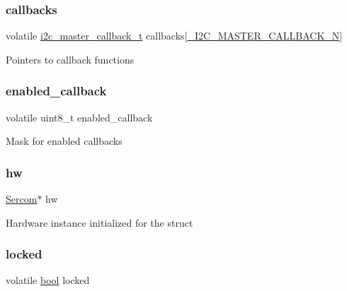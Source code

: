 \subsubsection{\texorpdfstring{callbacks}{callbacks}}
{\footnotesize\ttfamily volatile \mbox{\hyperlink{group__asfdoc__sam0__sercom__i2c__group_ga0ef653593dbacc01735c61e59ec3f0da}{i2c\+\_\+master\+\_\+callback\+\_\+t}} callbacks\mbox{[}\mbox{\hyperlink{group__asfdoc__sam0__sercom__i2c__group_gga844ac2694772642cfee08a29c50bf054a3563390afb1b1b26a6252e0b5981ed06}{\+\_\+\+I2\+C\+\_\+\+M\+A\+S\+T\+E\+R\+\_\+\+C\+A\+L\+L\+B\+A\+C\+K\+\_\+N}}\mbox{]}}

Pointers to callback functions \mbox{\label{structi2c__master__module_a88dcc0d45e96ac358f7e095040d108bc}} 
\subsubsection{\texorpdfstring{enabled\_callback}{enabled\_callback}}
{\footnotesize\ttfamily volatile uint8\+\_\+t enabled\+\_\+callback}

Mask for enabled callbacks \mbox{\label{structi2c__master__module_a0c1e47f7408dce5f667a53398c82d13a}} 
\subsubsection{\texorpdfstring{hw}{hw}}
{\footnotesize\ttfamily \mbox{\hyperlink{union_sercom}{Sercom}}$\ast$ hw}

Hardware instance initialized for the struct \mbox{\label{structi2c__master__module_a765892434f9329ded45a5287eeb75957}} 
\subsubsection{\texorpdfstring{locked}{locked}}
{\footnotesize\ttfamily volatile \mbox{\hyperlink{group__group__sam0__utils_ga97a80ca1602ebf2303258971a2c938e2}{bool}} locked}

